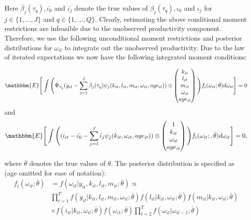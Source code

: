 \documentclass{article}
\begin{document}
Here $\bar{\beta}_{j}(\tau_{q}), \bar{\iota_{0}}$ and $\bar{\iota_{j}}$ denote the true values of $\beta_{j}(\tau_{q}), \iota_{0}$ and $\iota_{j}$ for $j\in\{1,\dots, J\}$ and $q\in\{1,\dots,Q\}$. Clearly, estimating the above conditional moment restrictions are infeasible due to the unobserved productivity component. Therefore, we use the following unconditional moment restrictions and posterior distributions for $\omega_{it}$ to integrate out the unobserved productivity. Due to the law of iterated expectations we now have the following integrated moment conditions:

\begin{equation}\label{yimc}
\mathbbm{E}\Bigg[\int\Bigg(\Psi_{\tau_{q}}(y_{it}-\sum_{j=1}^{J}\bar{\beta}_{j}(\tau_{q})\psi_{j}(k_{it}, l_{it}, m_{it}, \omega_{it}, age_{it}))\otimes
\begin{pmatrix}
k_{it} \\
l_{it}\\
m_{it} \\
\omega_{it} \\
age_{it}
\end{pmatrix}
\Bigg)f_{i}(\omega_{it};\bar{\theta})d\omega_{it}\Bigg]=0
\end{equation}
and 
\begin{equation}\label{iimc}
\begin{split}
\mathbbm{E}\Bigg[\int\Bigg((i_{it}-\bar{\iota_{0}}-\sum_{j=1}^{J}\bar{\iota}_{j}\psi_{j}(k_{it}, \omega_{it}, age_{it}))\otimes
\begin{pmatrix}
1 \\
k_{it} \\
\omega_{it}\\
age_{it}
\end{pmatrix}
\Bigg)f_{i}(\omega_{it};,\bar{\theta})d\omega_{it}\Bigg]=0,
\end{split}
\end{equation}

where $\bar{\theta}$ denotes the true values of $\theta$. The posterior distribution is specified as (age omitted for ease of notation):
\begin{equation}\label{posterior}
\begin{split}
f_{i}(\omega_{it};\bar{\theta})&=f(\omega_{it}|y_{it}, k_{it}, l_{it}, m_{it}; \bar{\theta}) \propto\\
&\prod_{t=1}^{T}f(y_{it}|k_{it}, l_{it}, m_{it}, \omega_{it};\bar{\theta})f(l_{it}|k_{it}, \omega_{it};\bar{\theta})f(m_{it}|k_{it}, \omega_{it};\bar{\theta}) \\
&\times f(i_{it}|k_{it}, \omega_{it};\bar{\theta})f(\omega_{i1};\bar{\theta})\prod_{t=2}^{T}f(\omega_{it}|\omega_{it-1};\bar{\theta})
\end{split}
\end{equation}
\end{document}
